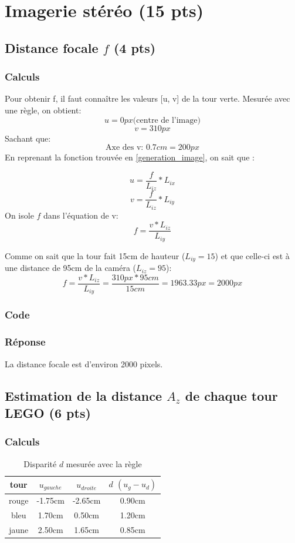 \documentclass[12pt]{article}
\begin{document}
\section{Imagerie stéréo  (15 pts)}

\subsection{Distance focale $f$ (4 pts)}
\subsubsection{Calculs}
Pour obtenir f, il faut connaître les valeurs [u, v] de la tour verte.
Mesur\'ee avec une r\`egle, on obtient:
\[ u = 0 px \text{(centre de l'image)}\]
\[ v = 310 px\]
Sachant que:
\[ \text{Axe des v: } 0.7cm = 200px \]
En reprenant la fonction trouv\'ee en \ref{generation_image}, on sait que :

\[
    u =  \frac{f}{L_{iz}} * L_{ix}
\]
\[
    v =  \frac{f}{L_{iz}} * L_{iy}
\]
On isole $f$ dans l'\'equation de v:
\[
    f =  \frac{v * L_{iz}}{L_{iy}}
\]

Comme on sait que la tour fait 15cm de hauteur ($L_{iy} = 15$) et que celle-ci est \`a une distance de 95cm de la cam\'era ($L_{iz} = 95$):
\[
    f =  \frac{v * L_{iz}}{L_{iy}} = \frac{310px * 95 cm}{15cm} = 1963.33 px = 2000 px
\]


\subsubsection{Code}
\subsubsection{Réponse}
La distance focale est d'environ 2000 pixels.

\subsection{Estimation de la distance $A_z$ de chaque tour LEGO (6 pts)}
\label{estimation_distance_Az}
\subsubsection{Calculs}

\begin{table}[h]
\caption{Disparit\'e $d$ mesur\'ee avec la r\`egle}
\label{TableCoord}
\begin{center}
\begin{tabular}{|c|c|c|c|}
\hline
    tour   &  $u_{gauche}$  &  $u_{droite}$  &  $d$ $(u_g - u_d)$ \\
\hline
    rouge  & -1.75cm & -2.65cm & 0.90cm \\
    bleu   & 1.70cm & 0.50cm & 1.20cm \\
    jaune  & 2.50cm & 1.65cm & 0.85cm \\
\hline
\end{tabular}
\end{center}
\end{table}
\end{document}
